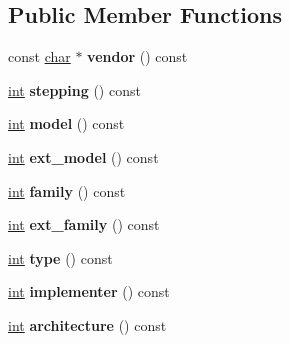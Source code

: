 \subsection*{Public Member Functions}
\begin{DoxyCompactItemize}
\item 
\mbox{\label{classv8_1_1base_1_1CPU_aa00d6c7570f40c5dedf2b07b966cbae4}} 
const \mbox{\hyperlink{classchar}{char}} $\ast$ {\bfseries vendor} () const
\item 
\mbox{\label{classv8_1_1base_1_1CPU_a8e3186905219faa656e375d74a937c9a}} 
\mbox{\hyperlink{classint}{int}} {\bfseries stepping} () const
\item 
\mbox{\label{classv8_1_1base_1_1CPU_abe06e4dfbdf9ee1f02130e783b5c8690}} 
\mbox{\hyperlink{classint}{int}} {\bfseries model} () const
\item 
\mbox{\label{classv8_1_1base_1_1CPU_ad77ba8e6c4c01331476f629cbe859332}} 
\mbox{\hyperlink{classint}{int}} {\bfseries ext\+\_\+model} () const
\item 
\mbox{\label{classv8_1_1base_1_1CPU_a5f2515f44387042d8c413cd76d7a180c}} 
\mbox{\hyperlink{classint}{int}} {\bfseries family} () const
\item 
\mbox{\label{classv8_1_1base_1_1CPU_aa2d15c9d9c7d0aee4505548fa6d20548}} 
\mbox{\hyperlink{classint}{int}} {\bfseries ext\+\_\+family} () const
\item 
\mbox{\label{classv8_1_1base_1_1CPU_ae4706a2a366d8cddfe43ee6fdff50226}} 
\mbox{\hyperlink{classint}{int}} {\bfseries type} () const
\item 
\mbox{\label{classv8_1_1base_1_1CPU_a3ba680d03acab087945b0d9bd2bc7c98}} 
\mbox{\hyperlink{classint}{int}} {\bfseries implementer} () const
\item 
\mbox{\label{classv8_1_1base_1_1CPU_a10d8eb66cf7fd400b4672a9f52827050}} 
\mbox{\hyperlink{classint}{int}} {\bfseries architecture} () const
\item 

\end{DoxyCompactItemize}

